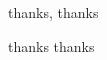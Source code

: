 \begin{acknowledgements}
  thanks, thanks
\end{acknowledgements}
\begin{dedication}
  thanks thanks
\end{dedication}

